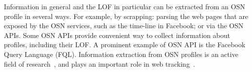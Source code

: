 \documentclass[journal]{IEEEtran}
\newtheorem{definition}{Definition}
\begin{document}








Information in general and the LOF in particular can be extracted from an OSN profile in several ways. For example, by scrapping: parsing the web pages that are exposed by the OSN services, such as the time-line in Facebook; or via the OSN APIs. Some OSN APIs provide convenient way to collect information about profiles, including their LOF. A prominent example of OSN API is the Facebook Query Language (FQL). 	
Information extraction from OSN profiles is an active field of research~\cite[inter alia]{tang2010aCombinationApproach,pawlas2012universal,li2016privacy,li2017adaptive}, and plays an important role in web tracking~\cite{ermakova2018web,bujlow2017survey}. 
\end{document}
